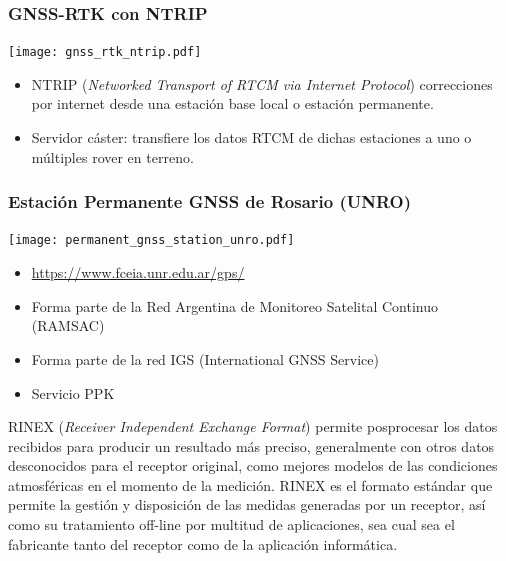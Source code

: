 \begin{frame}
{   }
\end{frame}

\begin{frame}
    \frametitle{GNSS-RTK con NTRIP}
    \begin{center}
        \texttt{[image: gnss\_rtk\_ntrip.pdf]}
    \end{center}
    
    \begin{itemize}
        \item NTRIP (\emph{Networked Transport of RTCM via Internet Protocol}) correcciones por internet desde una estación base local o estación permanente.
        \item Servidor cáster: transfiere los datos RTCM de dichas estaciones a uno o múltiples rover en terreno.
    \end{itemize}
\end{frame}

\begin{frame}
    \frametitle{Estación Permanente GNSS de Rosario (UNRO)}
    \begin{center}
        \texttt{[image: permanent\_gnss\_station\_unro.pdf]}
    \end{center}

    \begin{itemize}
        \item \href{https://www.fceia.unr.edu.ar/gps/}{https://www.fceia.unr.edu.ar/gps/}
        \item Forma parte de la Red Argentina de Monitoreo Satelital Continuo (RAMSAC)
        \item Forma parte de la red IGS (International GNSS Service)
        \item Servicio PPK
    \end{itemize}
    
    RINEX (\emph{Receiver Independent Exchange Format})  permite posprocesar los datos recibidos para producir un resultado más preciso, generalmente con otros datos desconocidos para el receptor original, como mejores modelos de las condiciones atmosféricas en el momento de la medición.
    RINEX es el formato estándar que permite la gestión y disposición de las medidas generadas por un receptor, así como su tratamiento off-line por multitud de aplicaciones, sea cual sea el fabricante tanto del receptor como de la aplicación informática.

\end{frame}


